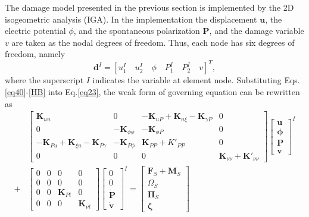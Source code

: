 The damage model presented in the previous section is implemented by the 2D isogeometric analysis (IGA). In the implementation the displacement $\mathbf{u}$, the electric potential $\phi$, and the spontaneous polarization $\mathbf{P}$, and the damage variable $v$ are taken as the nodal degrees of freedom. Thus, each node has six degrees of freedom, namely
\begin{equation}
    \mathbf{d}^I=\left[ u_1^I\quad u_2^I\quad \phi\quad P_1^I\quad P_2^I\quad v \right]^T,
\end{equation}
where the superscript $I$ indicates the variable at element node. 
Substituting Eqs.\eqref{eq40}-\eqref{HB} into Eq.\eqref{eq23}, the weak form of governing equation can be rewritten as 
\begin{equation}
\begin{split}
        &\begin{bmatrix}
            \mathbf{K}_{uu} & 0 & -\mathbf{K}_{uP}+\mathbf{K}_{u\xi}-\mathbf{K}_{\gamma P} & 0 \\
            0 & -\mathbf{K}_{\phi\phi} & -\mathbf{K}_{\phi P} & 0 \\
            -\mathbf{K}_{Pu}+\mathbf{K}_{\xi u}-\mathbf{K}_{P \gamma} & -\mathbf{K}_{P\phi } & \mathbf{K}_{PP}+K'_{PP} & 0 \\
            0 & 0 & 0 & \mathbf{K}_{\nu\nu}+\mathbf{K}'_{\nu\nu}
        \end{bmatrix}
        \begin{bmatrix}
            \mathbf{u}\\ \mathbf{\phi} \\ \mathbf{P} \\ \mathbf{v}
        \end{bmatrix}^I \\
       + &
        \begin{bmatrix}
            0 & 0 & 0 & 0 \\
            0 & 0 & 0 & 0 \\
            0 & 0 & \mathbf{K}_{Pt} & 0 \\
            0 & 0 & 0 & \mathbf{K}_{\nu t} 
        \end{bmatrix}
        \begin{bmatrix}
            0\\ 0 \\ \dot{\mathbf{P}} \\ \dot{\mathbf{v}}
        \end{bmatrix}^I
        =
        \begin{bmatrix}
            \mathbf{F}_S+\mathbf{M}_S \\
            {\Omega}_S \\
            \mathbf{\Pi}_S \\
            \mathbf{\zeta}
        \end{bmatrix}
\end{split}
\end{equation}
